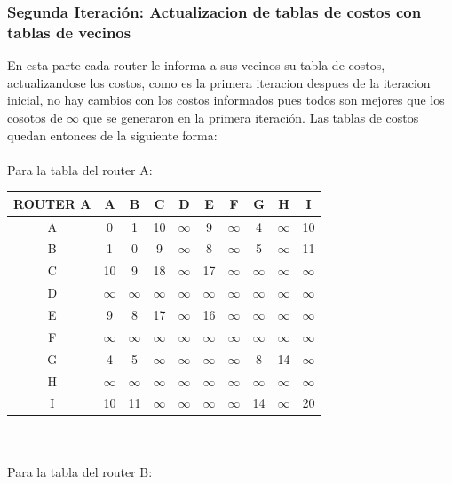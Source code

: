 \documentclass{article}
\begin{document}
\subsubsection*{Segunda Iteración: Actualizacion de tablas de costos con tablas de vecinos}
En esta parte cada router le informa a sus vecinos su tabla de costos, actualizandose los costos, como es la primera iteracion despues de la iteracion inicial, no hay cambios con los costos informados pues todos son mejores que los cosotos de $\infty$ que se generaron en la primera iteración. Las tablas de costos quedan entonces de la siguiente forma:\\
\\
Para la tabla del router A:\\
\begin{tabular}{ | c | c | c | c | c | c | c | c | c | c |}
\hline                 
ROUTER A    & A      & B      & C      & D      & E      & F      & G      & H      & I      \\
\hline
        A   & 0      & 1      &10      &$\infty$& 9      &$\infty$& 4      &$\infty$& 10     \\
\hline
        B   & 1      & 0      & 9      &$\infty$& 8      &$\infty$& 5      &$\infty$& 11     \\
\hline
        C   & 10     & 9      & 18     &$\infty$& 17     &$\infty$&$\infty$&$\infty$&$\infty$\\
\hline
        D   &$\infty$&$\infty$&$\infty$&$\infty$&$\infty$&$\infty$&$\infty$&$\infty$&$\infty$\\
\hline
        E   & 9      & 8      & 17     &$\infty$& 16     &$\infty$&$\infty$&$\infty$&$\infty$\\
\hline
        F   &$\infty$&$\infty$&$\infty$&$\infty$&$\infty$&$\infty$&$\infty$&$\infty$&$\infty$\\
\hline
        G   & 4      & 5      &$\infty$&$\infty$&$\infty$&$\infty$& 8      & 14     &$\infty$\\
\hline
        H   &$\infty$&$\infty$&$\infty$&$\infty$&$\infty$&$\infty$&$\infty$&$\infty$&$\infty$\\
\hline 
        I   & 10     & 11     &$\infty$&$\infty$&$\infty$&$\infty$& 14     &$\infty$& 20     \\
\hline 
\end{tabular}
\\\\
Para la tabla del router B:\\
\end{document}
